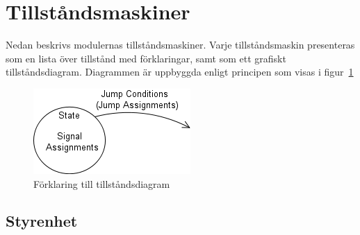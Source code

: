 \documentclass[a4paper,11pt]{article}
\begin{document}
\section{Tillståndsmaskiner}

	Nedan beskrivs modulernas tillståndsmaskiner. Varje tillståndsmaskin presenteras
	som en lista över tillstånd med förklaringar, samt som ett grafiskt tillståndsdiagram.
	Diagrammen är uppbyggda enligt principen som visas i figur~\ref{fig:SMExp}\\
	
	\begin{figure}[H]
	  \centering
	      \includegraphics[scale=0.5, angle=0]{StateMachineExplained.png}		
	  	\caption{Förklaring till tillståndsdiagram}	
		\label{fig:SMExp}
	\end{figure}
	
\label{sec:Tillstandsmaskiner}	

\pagebreak
	
\subsection{Styrenhet}
\end{document}
